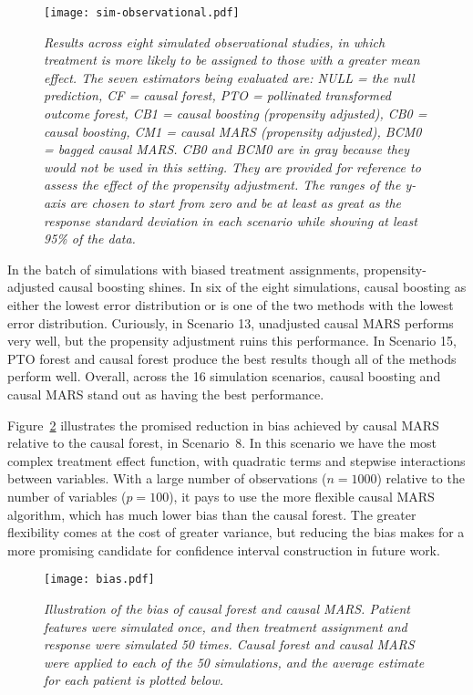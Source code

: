 \documentclass{article}
\begin{document}
\begin{figure}
\caption{\it Results across eight simulated observational studies, in which
  treatment is more likely to be assigned to those with a greater mean effect.
  The seven estimators being evaluated are:
  NULL = the null prediction, CF = causal forest,
  PTO = pollinated transformed outcome forest,
  CB1 = causal boosting (propensity adjusted), CB0 = causal boosting,
  CM1 = causal MARS (propensity adjusted), BCM0 = bagged causal MARS.
  CB0 and BCM0 are
  in gray because they would not be used in this setting. They are provided for
  reference to assess the effect of the propensity adjustment. The ranges of
  the y-axis are chosen to start from zero and be at least as great as the
  response standard deviation in each scenario while showing at least 95\% of
  the data.}
\label{fig-sim-observational}
\texttt{[image: sim-observational.pdf]}
\end{figure}

In the batch of simulations with biased treatment assignments,
propensity-adjusted causal boosting shines. In six of the eight simulations,
causal boosting as either the lowest error distribution or is one of the two
methods with the lowest error distribution. Curiously, in Scenario 13,
unadjusted causal MARS performs very well, but the propensity adjustment ruins
this performance. In Scenario 15, PTO forest and causal forest produce the
best results though all of the methods perform well. Overall, across the 16
simulation scenarios, causal boosting and causal MARS stand out as having the
best performance.

Figure~\ref{fig-bias}
illustrates the promised reduction in bias achieved by causal MARS
relative to the causal forest, in Scenario~8. In this scenario we have the most
complex treatment effect function, with quadratic terms and stepwise
interactions between variables. With a large number of observations
($n = 1000$) relative to the number of variables ($p = 100$), it pays to use
the more flexible causal MARS algorithm, which has much lower bias than the
causal forest. The greater flexibility comes at the cost of greater variance,
but reducing the bias makes for a more promising candidate for confidence
interval construction in future work.

\begin{figure}
\caption{\it Illustration of the bias of causal forest and causal MARS. Patient
features were simulated once, and then treatment assignment and response were
simulated 50 times. Causal forest and causal MARS were applied to each of the
50 simulations, and the average estimate for each patient is plotted below.}
\label{fig-bias}
\centering
\texttt{[image: bias.pdf]}
\end{figure}
\end{document}
